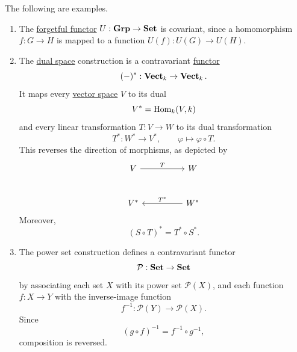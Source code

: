 	\begin{example}
	  \label{ex:covariant-and-contravariant-functors}
		The following are examples.
		\begin{enumerate}
			\item The \hyperref[def:forgetful-functor]{forgetful functor}
				$U: \operatorname{\mathbf{Grp}} \to \operatorname{\mathbf{Set}}$ is covariant, since
				a homomorphism $f: G \to H$ is mapped
				to a function $U(f): U(G) \to U(H)$.

			\item The \hyperref[lin-def:dual-space]{dual space} construction is a contravariant
				\hyperref[def:functor]{functor}
				\begin{equation}
					(-)^*: \operatorname{\mathbf{Vect}}_k \to \operatorname{\mathbf{Vect}}_k.
				\end{equation}
				It maps every \hyperref[lin-def:vector-space]{vector space} $V$ to its dual
				\begin{equation}
					V^* = \operatorname{Hom}_k(V,k)
				\end{equation}
				and every linear transformation $T: V \to W$
				to its dual transformation
				\begin{equation}
					T^*: W^* \to V^*, \qquad
					\varphi \mapsto \varphi \circ T.
				\end{equation}
				This reverses the direction of morphisms,
				as depicted by
				\begin{equation}
					\begin{tikzcd}[column sep=huge, row sep=large]
						V \arrow[r, "T"] & W \\
						V^* & W^* \arrow[l, "T^*"']
					\end{tikzcd}
				\end{equation}
				Moreover,
				\begin{equation}
					(S \circ T)^* = T^* \circ S^*.
				\end{equation}

			\item The power set construction defines a
				contravariant functor
				\begin{equation}
					\mathcal P: \operatorname{\mathbf{Set}} \to \operatorname{\mathbf{Set}}
				\end{equation}
				by associating each set $X$ with its power
				set $\mathcal P(X)$, and each function
				$f: X \to Y$ with the inverse-image function
				\begin{equation}
					f^{-1}: \mathcal P(Y) \to \mathcal P(X).
				\end{equation}
				Since
				\begin{equation}
					(g \circ f)^{-1} = f^{-1} \circ g^{-1},
				\end{equation}
				composition is reversed.
		\end{enumerate}
	\end{example}

